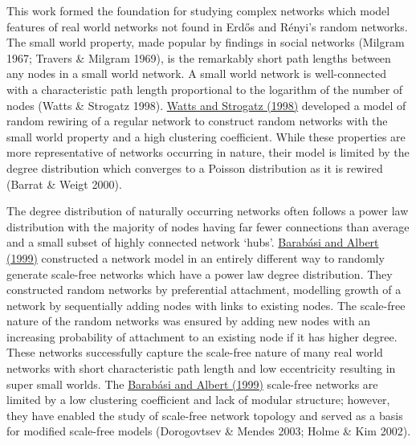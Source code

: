 This work formed the foundation for studying complex networks which
model features of real world networks not found in Erd\H{o}s and
R\'enyi{\textquoteright}s random networks. The small world property,
made popular by findings in social networks (Milgram 1967; Travers \&
Milgram 1969), is the remarkably short path lengths between any nodes
in a small world network. A small world network is well-connected
with a characteristic path length proportional to the logarithm of the
number of nodes (Watts \& Strogatz 1998). \hyperlink{ENREF112}{Watts
and Strogatz (1998)} developed a model of random rewiring of a regular
network to construct random networks with the small world property and
a high clustering coefficient. While these properties are more
representative of networks occurring in nature, their model is limited
by the degree distribution which converges to a Poisson distribution as
it is rewired (Barrat \& Weigt 2000). 


The degree distribution of naturally occurring networks often follows a
power law distribution with the majority of nodes having far fewer
connections than average and a small subset of highly connected network
{\textquoteleft}hubs{\textquoteright}. \hyperlink{ENREF7}{Barab\'asi
and Albert (1999)} constructed a network model in an entirely different
way to randomly generate scale-free networks which have a power law
degree distribution. They constructed random networks by preferential
attachment, modelling growth of a network by sequentially adding nodes
with links to existing nodes. The scale-free nature of the random
networks was ensured by adding new nodes with an increasing probability
of attachment to an existing node if it has higher degree. These
networks successfully capture the scale-free nature of many real world
networks with short characteristic path length and low eccentricity
resulting in super small worlds. The \hyperlink{ENREF7}{Barab\'asi
and Albert (1999)} scale-free networks are limited by a low clustering
coefficient and lack of modular structure; however, they have enabled
the study of scale-free network topology and served as a basis for
modified scale-free models (Dorogovtsev \& Mendes 2003; Holme \& Kim
2002). 


